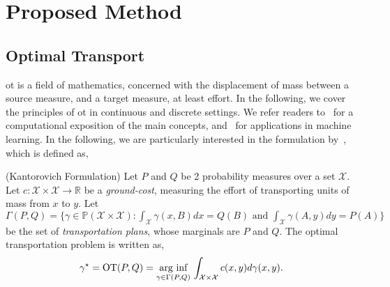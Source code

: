 \section{Proposed Method}\label{sec:methodology}

\subsection{Optimal Transport}\label{sec:ot}

\gls{ot} is a field of mathematics, concerned with the displacement of mass between a source measure, and a target measure, at least effort. In the following, we cover the principles of \gls{ot} in continuous and discrete settings. We refer readers to~\cite{peyre2020computationaloptimaltransport} for a computational exposition of the main concepts, and~\cite{montesuma2024recentadvancesoptimaltransport} for applications in machine learning. In the following, we are particularly interested in the formulation by~\cite{kantorovich1942transfer}, which is defined as,
\begin{definition}{(Kantorovich Formulation)}\label{def:Kantorovich_continuous}
Let $P$ and $Q$ be 2 probability measures over a set $\mathcal{X}$. Let $c:\mathcal{X}\times\mathcal{X}\rightarrow\mathbb{R}$ be a \emph{ground-cost}, measuring the effort of transporting units of mass from $x$ to $y$. Let $\Gamma(P, Q) = \{\gamma \in \mathbb{P}(\mathcal{X}\times\mathcal{X}): \int_{\mathcal{X}}\gamma(x,B)dx = Q(B) \text{ and }\int_{\mathcal{X}}\gamma(A,y)dy = P(A)\}$ be the set of \emph{transportation plans}, whose marginals are $P$ and $Q$. The optimal transportation problem is written as,
\begin{align}
    \gamma^{\star} = \text{OT}(P,Q) = \underset{\gamma \in \Gamma(P, Q)}{\text{arg inf}}\,\int_{\mathcal{X}\times\mathcal{X}}c(x,y)d\gamma(x,y).\label{eq:kantorovich_continuous}
\end{align}
\end{definition}

